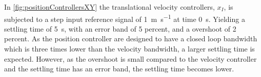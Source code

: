 \begin{minipage}{\linewidth}
\begin{minipage}{0.5\linewidth}
\begin{figure}[H]
            \centering
            \label{fig:velocityControllersXYAction}
        \end{figure}
    \end{minipage}
\end{minipage}

In \autoref{fig:positionControllersXY} the translational velocity controllers, $x_I$, is subjected to a step input reference signal of \SI{1}{m s^{-1}} at time \SI{0}{s}. Yielding a settling time of \SI{5}{s}, with an error band of 5 percent, and a overshoot of 2 percent. As the position controller are designed to have a closed loop bandwidth which is three times lower than the velocity bandwidth, a larger settling time is expected. However, as the overshoot is small compared to the velocity controller and the settling time has an error band, the settling time becomes lower.

